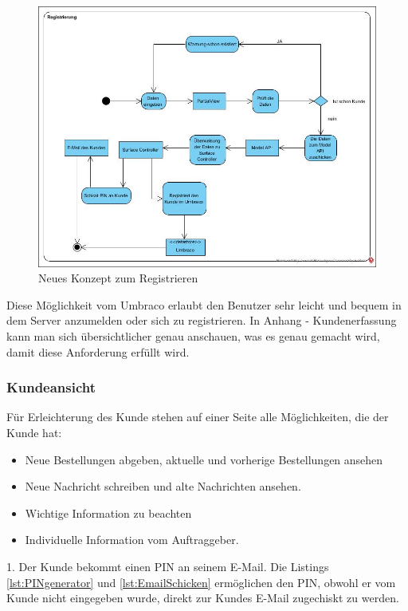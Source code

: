 \begin{figure}[h]
	\centering
	\includegraphics[width=1\linewidth]{Graphics/Registrierung.JPG}
	\caption[neues Konzept: Registrierung]{Neues Konzept zum Registrieren}
	\label{fig:Registrierung}
\end{figure}

Diese Möglichkeit vom Umbraco erlaubt den Benutzer sehr leicht und bequem in dem Server anzumelden oder sich zu registrieren.
In Anhang - Kundenerfassung kann man sich übersichtlicher genau anschauen, was es genau gemacht wird, damit diese Anforderung erfüllt wird.

\pagebreak

\subsubsection{Kundeansicht}
Für Erleichterung des Kunde stehen auf einer Seite alle Möglichkeiten, die der Kunde hat: 

\begin{itemize}	
	\item Neue Bestellungen abgeben, aktuelle und vorherige Bestellungen ansehen
	\item Neue Nachricht schreiben und alte Nachrichten ansehen.
	\item Wichtige Information zu beachten
	\item Individuelle Information vom Auftraggeber.
\end{itemize}
1. Der Kunde bekommt einen PIN an seinem E-Mail. Die Listings \ref{lst:PINgenerator} und \ref{lst:EmailSchicken} ermöglichen den PIN, obwohl er vom Kunde nicht eingegeben wurde, direkt zur Kundes E-Mail zugechiskt zu werden.

